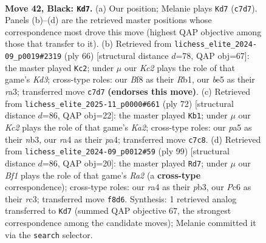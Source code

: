 \documentclass[11pt]{article}
\begin{document}
\clearpage

\begin{figure}[p]\centering
\begin{subfigure}{0.46\textwidth}\centering
\resizebox{\linewidth}{!}{%
\newchessgame
\chessboard[
  setfen={5b1r/r1k3p1/p1p4p/Pp1bBp2/R1p4P/4P1P1/1P3P1N/3K2R1 b - - 1 42},
  showmover=false,
  pgfstyle=straightmove, color=movearrow, markmove={c7-d7}
]}
\caption{}
\end{subfigure}\hfill
\begin{subfigure}{0.46\textwidth}\centering
\resizebox{\linewidth}{!}{%
\newchessgame
\chessboard[
  setfen={3b2k1/1r3p2/2pBp2p/2PpP1p1/1P3P2/r2K2P1/7P/1R1R4 w - - 1 34},
  showmover=false,
  pgfstyle=straightmove, color=movearrow, markmove={d3-c2}
]}
\caption{}
\end{subfigure}
\\[4pt]
\begin{subfigure}{0.46\textwidth}\centering
\resizebox{\linewidth}{!}{%
\newchessgame
\chessboard[
  setfen={2r3k1/3r1pp1/1R2p3/3p3p/p2P1b2/PnPB1P1P/K1R3P1/4B3 w - - 8 37},
  showmover=false,
  pgfstyle=straightmove, color=movearrow, markmove={a2-b1}
]}
\caption{}
\end{subfigure}\hfill
\begin{subfigure}{0.46\textwidth}\centering
\resizebox{\linewidth}{!}{%
\newchessgame
\chessboard[
  setfen={8/r5pk/1bp2p2/pr2pPp1/4P1K1/1PRP3P/R3N1P1/8 b - - 5 50},
  showmover=false,
  pgfstyle=straightmove, color=movearrow, markmove={a7-d7}
]}
\caption{}
\end{subfigure}
\caption{\textbf{Move 42, Black: \texttt{Kd7}.} (a) Our position; Melanie plays \texttt{Kd7} (\texttt{c7d7}). Panels (b)--(d) are the retrieved master positions whose correspondence most drove this move (highest QAP objective among those that transfer to it). (b) Retrieved from \texttt{lichess\_elite\_2024-09\_p0019\#2319} (ply 66) [structural distance $d$=78, QAP obj=67]: the master played \texttt{Kc2}; under $\mu$ our \emph{Kc2} plays the role of that game's \emph{Kd3}; cross-type roles: our \emph{B}f8 as their \emph{R}b1, our \emph{b}e5 as their \emph{r}a3; transferred move \texttt{c7d7} \textbf{(endorses this move)}. (c) Retrieved from \texttt{lichess\_elite\_2025-11\_p0000\#661} (ply 72) [structural distance $d$=86, QAP obj=22]: the master played \texttt{Kb1}; under $\mu$ our \emph{Kc2} plays the role of that game's \emph{Ka2}; cross-type roles: our \emph{p}a5 as their \emph{n}b3, our \emph{r}a4 as their \emph{p}a4; transferred move \texttt{c7c8}. (d) Retrieved from \texttt{lichess\_elite\_2024-09\_p0012\#59} (ply 99) [structural distance $d$=86, QAP obj=20]: the master played \texttt{Rd7}; under $\mu$ our \emph{Bf1} plays the role of that game's \emph{Ra2} (a \textbf{cross-type} correspondence); cross-type roles: our \emph{r}a4 as their \emph{p}b3, our \emph{P}c6 as their \emph{r}c3; transferred move \texttt{f8d6}. Synthesis: 1 retrieved analog transferred to \texttt{Kd7} (summed QAP objective 67, the strongest correspondence among the candidate moves); Melanie committed it via the \texttt{search} selector.}
\label{fig:thought-m83}
\end{figure}
\end{document}

